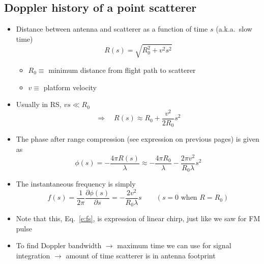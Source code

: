 \documentclass[11pt, oneside]{article}
\begin{document}
\subsection{Doppler history of a point scatterer}
\label{s:doppler}

\begin{itemize}
	\item Distance between antenna and scatterer as a function of time $s$ (a.k.a.\ slow time)
	\begin{equation}
		\label{e:Rs}
		R(s) = \sqrt{R_0^2 + v^2s^2}
	\end{equation}
	\begin{itemize}
		\item[] $R_0 \equiv$ minimum distance from flight path to scatterer
		\item[] $v \equiv$ platform velocity
	\end{itemize}
	\item Usually in RS, $vs \ll R_0$
	\begin{equation}
		\label{e:Rapprox}
		\Rightarrow\quad R(s) \approx R_0 + \frac{v^2}{2R_0}s^2
	\end{equation}
	\item The phase after range compression (see expression on previous pages) is given as
	\begin{equation}
		\label{e:phis}
		\phi(s) = -\frac{4\pi R(s)}{\lambda} \approx -\frac{4\pi R_0}{\lambda} - \frac{2\pi v^2}{R_0\lambda}s^2
	\end{equation}
	\item The instantaneous frequency is simply
	\begin{equation}
		\label{e:fs}
		f(s) = \frac{1}{2\pi}\frac{\partial\phi(s)}{\partial s} = -\frac{2v^2}{R_0\lambda}s \qquad (s = 0 \text{ when } R = R_0)
	\end{equation}
	\item Note that this, Eq.~\eqref{e:fs}, is expression of linear chirp, just like we saw for FM pulse
	\item To find Doppler bandwidth $\rightarrow$ maximum time we can use for signal integration $\rightarrow$ amount of time scatterer is in antenna footprint
\end{itemize}
\end{document}
